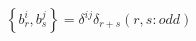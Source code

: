 \begin{equation}
\left\{b_{r}^{i}, b_{s}^{j}\right\}=\delta^{ij}\delta_{r+s} (r, s:
odd )
\end{equation}

